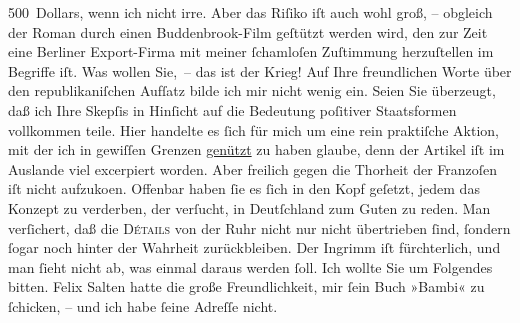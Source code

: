 \begin{ledgroupsized}[t]{13cm}
                    500 Dollars, wenn ich nicht irre. Aber das Riſiko iſt auch wohl groß, – obgleich
                    der Roman durch einen Buddenbrook-Film
                    geſtützt werden wird, den zur Zeit eine Berliner Export-Firma mit meiner ſchamloſen Zuſtimmung {\pb}herzuſtellen im Begriffe iſt. Was
                    wollen Sie, – das ist der Krieg!\pend
           \pstart
           Auf Ihre freundlichen Worte über den republikaniſchen Aufſatz bilde ich mir nicht wenig ein.
                    Seien Sie überzeugt, daß ich Ihre Skepſis in Hinſicht auf die Bedeutung
                    poſitiver Staatsformen vollkommen teile. Hier handelte es ſich für mich um eine
                    rein praktiſche Aktion, mit der ich in gewiſſen Grenzen \uline{genützt} zu haben glaube, denn der Artikel iſt im Auslande viel excerpiert worden. Aber
                    freilich gegen die Thorheit der Franzoſen iſt
                    nicht aufzuko{\geminationm}en. Offenbar haben ſie es ſich in den
                    Kopf geſetzt, jedem das Konzept zu verderben, der verſucht, in Deutſchland zum Guten zu reden. Man verſichert, daß die
                        \textsc{Détails} von der Ruhr nicht nur nicht übertrieben ſind, ſon{\pb}dern ſogar noch hinter der Wahrheit
                    zurückbleiben. Der Ingrimm iſt fürchterlich, und man ſieht nicht ab, was einmal
                    daraus werden ſoll.\pend
           \pstart
           Ich wollte Sie um Folgendes bitten. Felix
                        Salten hatte die große Freundlichkeit, mir ſein Buch »Bambi« zu ſchicken, – und ich habe ſeine Adreſſe nicht.

\end{ledgroupsized}

